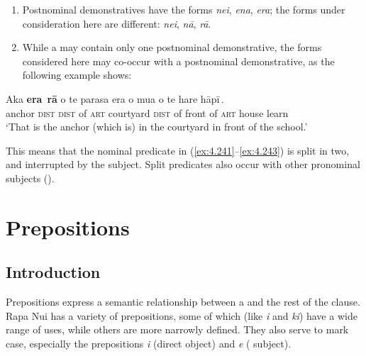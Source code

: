 \begin{enumerate}
\item 
Postnominal demonstratives have the forms \textit{nei}, \textit{ena}, \textit{era}; the forms under consideration here are different: \textit{nei}, \textit{nā}, \textit{rā}.

\item 
While a  may contain only one postnominal demonstrative, the forms considered here may co-occur with a postnominal demonstrative, as the following example shows:

\end{enumerate}

\ea\label{ex:4.243}
\gll {\ob}{\ꞌ}Aka \textbf{era}\,{\cb} \textbf{rā} {\ob}o te parasa era o mu{\ꞌ}a o te hare hāpī\,{\cb}. \\
{\db}anchor \textsc{dist} \textsc{dist} {\db}of \textsc{art} courtyard \textsc{dist} of front of \textsc{art} house learn \\

\glt
‘That is the anchor (which is) in the courtyard in front of the school.’ \textstyleExampleref{[R413.675]} 
\z

This means that the nominal predicate in (\ref{ex:4.241}–\ref{ex:4.243}) is split in two, and interrupted by the subject. Split predicates also occur with other pronominal subjects ().
\section{Prepositions}\label{sec:4.7}
\subsection{Introduction}\label{sec:4.7.1}

Prepositions express a semantic relationship between a  and the rest of the clause. Rapa Nui has a variety of prepositions, some of which (like \textit{{\ꞌ}i} and \textit{ki}) have a wide range of uses, while others are more narrowly defined. They also serve to mark case, especially the prepositions \textit{i} (direct object) and \textit{e} ( subject).

